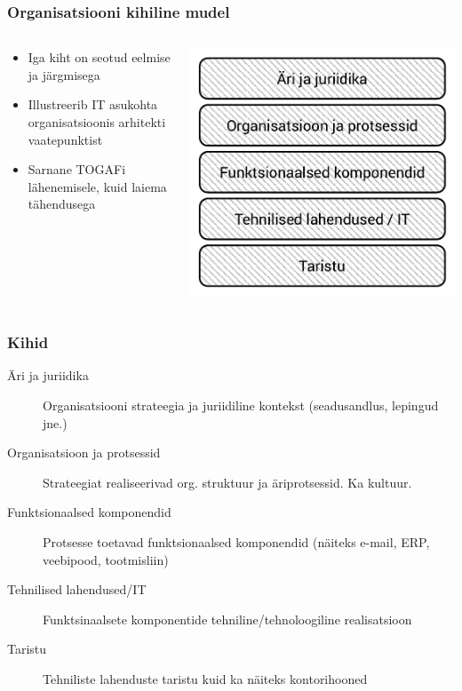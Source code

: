 \begin{frame}[fragile,label={stack}]
	\frametitle{Organisatsiooni kihiline mudel}
	\begin{columns}[t]
		\begin{column}{6cm}
			\begin{itemize}
				\item Iga kiht on seotud eelmise ja järgmisega
				\item Illustreerib IT asukohta organisatsioonis arhitekti vaatepunktist
				\item Sarnane TOGAFi lähenemisele, kuid laiema tähendusega
			\end{itemize}
		\end{column}
		\begin{column}[T]{5cm}
			\includegraphics[width=\textwidth]{stack.pdf}
		\end{column}
	\end{columns}
\end{frame}

\begin{frame}[fragile]
  \frametitle{Kihid}
  	\begin{description}
		\item[Äri ja juriidika] Organisatsiooni strateegia ja juriidiline kontekst (seadusandlus, lepingud jne.)
		\item[Organisatsioon ja protsessid] Strateegiat realiseerivad org. struktuur ja äriprotsessid. Ka kultuur.
		\item[Funktsionaalsed komponendid] Protsesse toetavad funktsionaalsed komponendid (näiteks e-mail, ERP, veebipood, tootmisliin)
		\item[Tehnilised lahendused/IT] Funktsinaalsete komponentide tehniline/tehnoloogiline realisatsioon
		\item[Taristu] Tehniliste lahenduste taristu kuid ka näiteks kontorihooned
	\end{description}
\end{frame}

